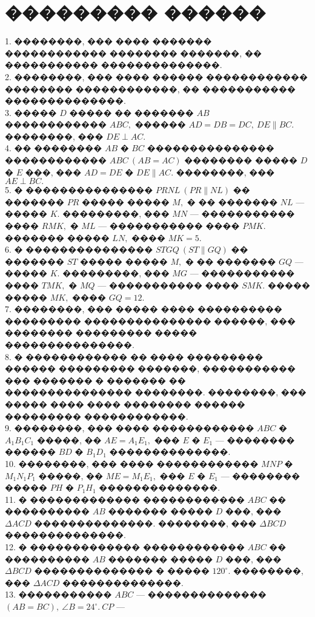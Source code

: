 \documentclass[12pt]{article}
\begin{document}
\section{��������� ������}
1. ��������, ��� ���� ������� ������������ �������� �������, �� ����������� ��������������.\\
2. ��������, ��� ���� ������ ������������ �������� ������������, �� ����������� ��������������.\\
3. ����� $D$ ����� �� ������� $AB$ ������������ $ABC,$ ������ $AD=DB=DC,\ DE\parallel BC.$ ��������, ��� $DE\perp AC.$\\
4. �� �������� $AB$ � $BC$ ��������������� ������������ $ABC\ (AB=AC)$ �������� ����� $D$ � $E$ ���, ��� $AD=DE$ � $DE\parallel AC.$ ��������, ��� $AE\perp BC.$\\
5. � ��������������� $PRNL\ (PR\parallel NL)$ �� ������� $PR$ ����� ����� $M,$ � �� ������� $NL$ --- ����� $K.$ ���������, ��� $MN$ --- ����������� ���� $RMK,$ � $ML$ --- ����������� ���� $PMK.$ ������� ����� $LN,$ ���� $MK=5.$\\
6. � ��������������� $STGQ\ (ST\parallel GQ)$ �� ������� $ST$ ����� ����� $M,$ � �� ������� $GQ$ --- ����� $K.$ ���������, ��� $MG$ --- ����������� ���� $TMK,$ � $MQ$ --- ����������� ���� $SMK.$ ����� ����� $MK,$ ���� $GQ=12.$\\
7. ��������, ��� ����� ���� ���������� ��������� ��������������� ������, ��� �������� ��������� ����� ���������������.\\
8. � ������������ �� ���� ��������� ������ ��������� �������, ����������� ��� ������� � ������� �� ��������������� ��������. ��������, ��� ����� ���� ���� �������� ������ ��������� ������������.\\
9. ��������, ��� ���� ������������ $ABC$ � $A_1B_1C_1$ �����, �� $AE=A_1E_1,$ ��� $E$ � $E_1$ --- �������� ������ $BD$ � $B_1D_1$ ��������������.\\
10. ��������, ��� ���� ������������ $MNP$ � $M_1N_1P_1$ �����, �� $ME=M_1E_1,$ ��� $E$ � $E_1$ --- �������� ����� $PH$ � $P_1H_1$ ��������������.\\
11. � ������������� ������������ $ABC$ �� ���������� $AB$ ������� ����� $D$ ���, ���
$\Delta ACD$ ��������������. ��������, ��� $\Delta BCD$ ��������������.\\
12. � ������������� ������������ $ABC$ �� ���������� $AB$ ������� ����� $D$ ���, ���
$\Delta BCD$ �������������� � ����� $120^\circ.$ ��������, ��� $\Delta ACD$ ��������������.\\
13. ����������� $ABC$ --- �������������� $(AB=BC),\ \angle B=24^\circ.\ CP$ ---
\end{document}
